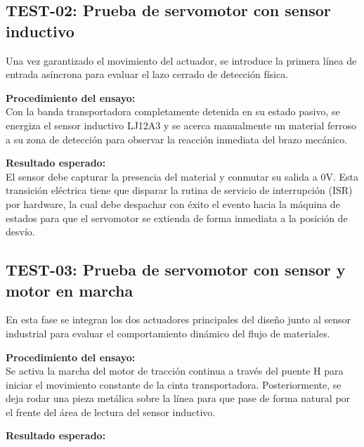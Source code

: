 \documentclass[12pt, letterpaper]{article}
\begin{document}
\subsection{TEST-02: Prueba de servomotor con sensor inductivo}
Una vez garantizado el movimiento del actuador, se introduce la primera línea de entrada asíncrona para evaluar el lazo cerrado de detección física.

\vspace{0.5cm}

\noindent \textbf{Procedimiento del ensayo:} \\

Con la banda transportadora completamente detenida en su estado pasivo, se energiza el sensor inductivo LJ12A3 y se acerca manualmente un material ferroso a su zona de detección para observar la reacción inmediata del brazo mecánico.

\vspace{0.5cm}

\noindent \textbf{Resultado esperado:} \\

El sensor debe capturar la presencia del material y conmutar su salida a 0V. Esta transición eléctrica tiene que disparar la rutina de servicio de interrupción (ISR) por hardware, la cual debe despachar con éxito el evento hacia la máquina de estados para que el servomotor se extienda de forma inmediata a la posición de desvío.

\subsection{TEST-03: Prueba de servomotor con sensor y motor en marcha}
En esta fase se integran los dos actuadores principales del diseño junto al sensor industrial para evaluar el comportamiento dinámico del flujo de materiales.

\vspace{0.5cm}

\noindent \textbf{Procedimiento del ensayo:} \\

Se activa la marcha del motor de tracción continua a través del puente H para iniciar el movimiento constante de la cinta transportadora. Posteriormente, se deja rodar una pieza metálica sobre la línea para que pase de forma natural por el frente del área de lectura del sensor inductivo.

\vspace{0.5cm}

\noindent \textbf{Resultado esperado:} \\
\end{document}
